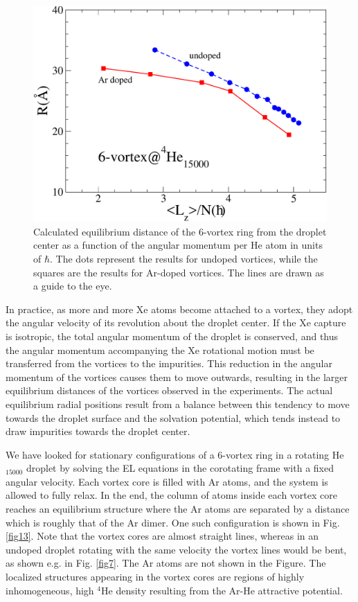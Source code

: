\begin{figure}[!]
\centerline{\includegraphics[width=0.9\linewidth,clip]{fig14}}
\caption{\label{fig14} 
Calculated equilibrium distance of the 6-vortex ring
from the droplet center as a function of the 
angular momentum per He atom in units of $\hbar$. 
The dots represent the results for undoped vortices, while the squares are the results for 
Ar-doped vortices. The lines are drawn as a guide to the eye.
}
\end{figure}

In practice, as more and more Xe atoms become
attached to a vortex, they adopt the angular velocity of its
revolution about the droplet center. 
If the Xe capture is isotropic, the total angular momentum of the droplet is conserved, and 
thus the angular momentum accompanying the Xe rotational motion must be
transferred from the vortices to the impurities. This reduction in the angular momentum of the
vortices causes them to move outwards, 
resulting in the larger
equilibrium distances of the vortices observed in 
the experiments. The actual equilibrium radial positions
result from a balance between this tendency to 
move towards the droplet surface 
and the solvation potential, 
which tends instead to draw impurities towards the droplet
center.

We have looked for stationary configurations of a 6-vortex ring
in a rotating He$_{15000}$ droplet by solving the
EL equations in the corotating frame with a fixed
angular velocity. Each vortex core is filled with Ar
atoms, and the system is allowed to fully relax.
In the end, the column of atoms inside each vortex core reaches an equilibrium structure 
where the Ar atoms are separated by a distance which  is roughly that of the Ar dimer.
One such configuration is shown in  Fig. \ref{fig13}. Note that 
the vortex cores are almost straight lines, whereas in an
undoped droplet rotating with the same velocity 
the vortex lines would be bent, 
as shown  e.g. in Fig. \ref{fig7}.
The Ar atoms are not shown in the Figure.
The localized structures appearing in the vortex cores are 
regions of highly inhomogeneous, high  $^4$He density
resulting from the Ar-He attractive potential.


